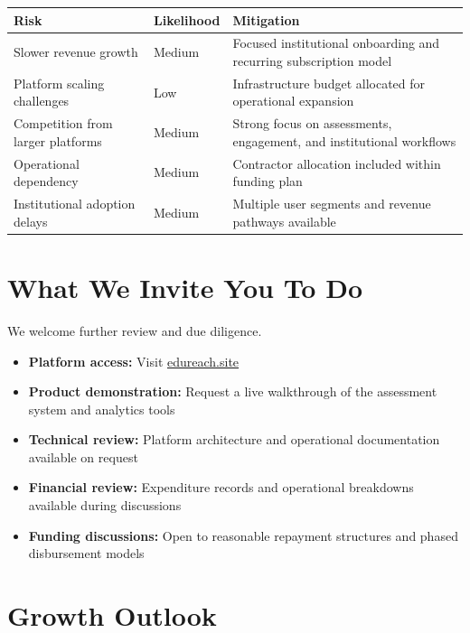 \documentclass[a4paper,11pt]{article}
\begin{document}
\begin{table}[h]
\centering
\begin{tabular}{@{}p{3cm} p{2.5cm} p{6.5cm}@{}}
\toprule
\rowcolor{indigobg}
\textcolor{indigobrand}{\textbf{Risk}} &
\textcolor{indigobrand}{\textbf{Likelihood}} &
\textcolor{indigobrand}{\textbf{Mitigation}} \\
\midrule
Slower revenue growth        & Medium & Focused institutional onboarding and recurring subscription model \\
Platform scaling challenges  & Low    & Infrastructure budget allocated for operational expansion \\
Competition from larger platforms & Medium & Strong focus on assessments, engagement, and institutional workflows \\
Operational dependency       & Medium & Contractor allocation included within funding plan \\
Institutional adoption delays & Medium & Multiple user segments and revenue pathways available \\
\bottomrule
\end{tabular}
\end{table}

\section{What We Invite You To Do}

We welcome further review and due diligence.

\begin{itemize}[nosep]
    \item \textbf{Platform access:} Visit \href{https://edureach.site}{edureach.site}
    \item \textbf{Product demonstration:} Request a live walkthrough of the assessment system and analytics tools
    \item \textbf{Technical review:} Platform architecture and operational documentation available on request
    \item \textbf{Financial review:} Expenditure records and operational breakdowns available during discussions
    \item \textbf{Funding discussions:} Open to reasonable repayment structures and phased disbursement models
\end{itemize}

\section{Growth Outlook}
\end{document}
